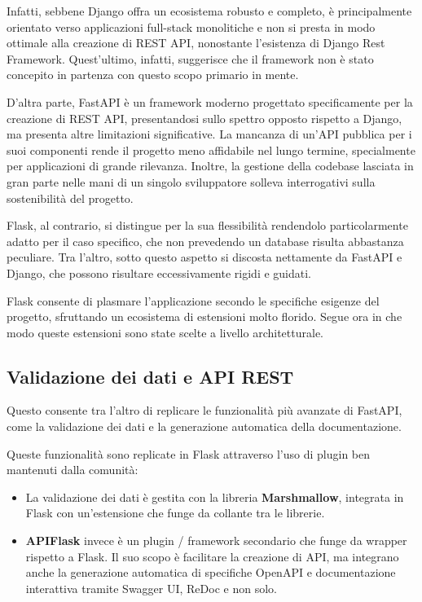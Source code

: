 Infatti, sebbene Django offra un ecosistema robusto e completo, è principalmente orientato verso applicazioni full-stack monolitiche e non si presta in modo ottimale alla creazione di REST API, nonostante l'esistenza di Django Rest Framework. Quest'ultimo, infatti, suggerisce che il framework non è stato concepito in partenza con questo scopo primario in mente.

D'altra parte, FastAPI è un framework moderno progettato specificamente per la creazione di REST API, presentandosi sullo spettro opposto rispetto a Django, ma presenta altre limitazioni significative. La mancanza di un'API pubblica per i suoi componenti rende il progetto meno affidabile nel lungo termine, specialmente per applicazioni di grande rilevanza. Inoltre, la gestione della codebase lasciata in gran parte nelle mani di un singolo sviluppatore solleva interrogativi sulla sostenibilità del progetto.

Flask, al contrario, si distingue per la sua flessibilità rendendolo particolarmente adatto per il caso specifico, che non prevedendo un database risulta abbastanza peculiare. Tra l'altro, sotto questo aspetto si discosta nettamente da FastAPI e Django, che possono risultare eccessivamente rigidi e guidati.

Flask consente di plasmare l'applicazione secondo le specifiche esigenze del progetto, sfruttando un ecosistema di estensioni molto florido. Segue ora in che modo queste estensioni sono state scelte a livello architetturale.

\subsection{Validazione dei dati e API REST}
Questo consente tra l'altro di replicare le funzionalità più avanzate di FastAPI, come la validazione dei dati e la generazione automatica della documentazione.

Queste funzionalità sono replicate in Flask attraverso l'uso di plugin ben mantenuti dalla comunità:
\begin{itemize}
    \item La validazione dei dati è gestita con la libreria \textbf{Marshmallow}, integrata in Flask con un'estensione che funge da collante tra le librerie.
    \item \textbf{APIFlask} invece è un plugin / framework secondario che funge da wrapper rispetto a Flask. Il suo scopo è facilitare la creazione di API, ma integrano anche la generazione automatica di specifiche OpenAPI e documentazione interattiva tramite Swagger UI, ReDoc e non solo.
\end{itemize}

